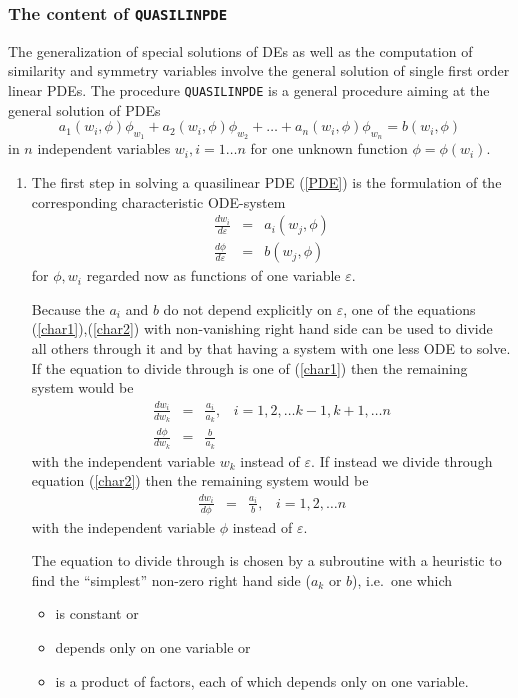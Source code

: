\subsubsection{The content of {\tt QUASILINPDE}}
The generalization of special solutions of DEs as well as the computation of
similarity and symmetry variables involve the general solution of single
first order linear PDEs.
The procedure {\tt QUASILINPDE} is a general procedure
aiming at the general solution of
PDEs
\begin{equation}
   a_1(w_i,\phi)\phi_{w_1} + a_2(w_i,\phi)\phi_{w_2} + \ldots +
   a_n(w_i,\phi)\phi_{w_n} = b(w_i,\phi) \label{PDE}
\end{equation}
in $n$ independent variables $w_i, i=1\ldots n$ for one unknown function
$\phi=\phi(w_i)$.
\begin{enumerate}
\item
The first step in solving a quasilinear PDE (\ref{PDE})
is the formulation of the corresponding characteristic ODE-system
\begin{eqnarray}
\frac{dw_i}{d\varepsilon} & = & a_i(w_j,\phi) \label{char1}   \\
\frac{d\phi}{d\varepsilon} & = & b(w_j,\phi)  \label{char2}
\end{eqnarray}
for $\phi, w_i$ regarded now as functions of one variable $\varepsilon$.

Because the $a_i$ and $b$ do not depend explicitly on $\varepsilon$, one of the
equations (\ref{char1}),(\ref{char2}) with non-vanishing right hand side
can be used to divide all others through it and by that having a system
with one less ODE to solve. 
If the equation to divide through is one of
(\ref{char1}) then the remaining system would be
\begin{eqnarray}
\frac{dw_i}{dw_k} & = & \frac{a_i}{a_k} , \;\;\;i=1,2,\ldots k-1,k+1,\ldots n
  \label{char3} \\
\frac{d\phi}{dw_k} & = & \frac{b}{a_k}  \label{char4}
\end{eqnarray}
with the independent variable $w_k$ instead of $\varepsilon$.
If instead we divide through equation
(\ref{char2}) then the remaining system would be
\begin{eqnarray}
\frac{dw_i}{d\phi} & = & \frac{a_i}{b} , \;\;\;i=1,2,\ldots n
  \label{char3a}
\end{eqnarray}
with the independent variable $\phi$ instead of $\varepsilon$.

The equation to divide through is chosen by a
subroutine with a heuristic to find the ``simplest'' non-zero
right hand side ($a_k$ or $b$), i.e.\ one which
\begin{itemize}
\item is constant or
\item depends only on one variable or
\item is a product of factors, each of which depends only on
one variable.
\end{itemize}


\end{enumerate}
